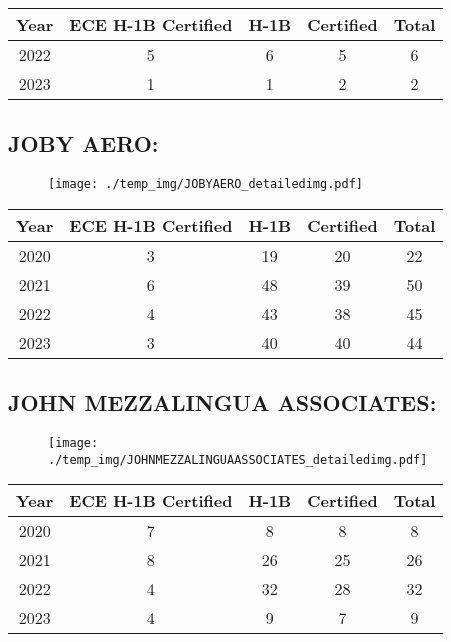 \documentclass{article}%
\begin{document}
%
\begin{longtable}{c|c|c|c|c}%
\hline%
Year&ECE H{-}1B Certified&H{-}1B&Certified&Total\\%
\hline%
2022&5&6&5&6\\%
\hline%
2023&1&1&2&2\\%
\hline%
\end{longtable}

%
\newpage%
\subsection{JOBY AERO:}%
\label{subsec:JOBYAERO}%
\label{JOBYAEROdetailed}%


\begin{figure}[htbp]%
\centering%
\texttt{[image: ./temp\_img/JOBYAERO\_detailedimg.pdf]}%
\end{figure}

%
\begin{longtable}{c|c|c|c|c}%
\hline%
Year&ECE H{-}1B Certified&H{-}1B&Certified&Total\\%
\hline%
2020&3&19&20&22\\%
\hline%
2021&6&48&39&50\\%
\hline%
2022&4&43&38&45\\%
\hline%
2023&3&40&40&44\\%
\hline%
\end{longtable}

%
\newpage%
\subsection{JOHN MEZZALINGUA ASSOCIATES:}%
\label{subsec:JOHNMEZZALINGUAASSOCIATES}%
\label{JOHNMEZZALINGUAASSOCIATESdetailed}%


\begin{figure}[htbp]%
\centering%
\texttt{[image: ./temp\_img/JOHNMEZZALINGUAASSOCIATES\_detailedimg.pdf]}%
\end{figure}

%
\begin{longtable}{c|c|c|c|c}%
\hline%
Year&ECE H{-}1B Certified&H{-}1B&Certified&Total\\%
\hline%
2020&7&8&8&8\\%
\hline%
2021&8&26&25&26\\%
\hline%
2022&4&32&28&32\\%
\hline%
2023&4&9&7&9\\%
\hline%
\end{longtable}
\end{document}
